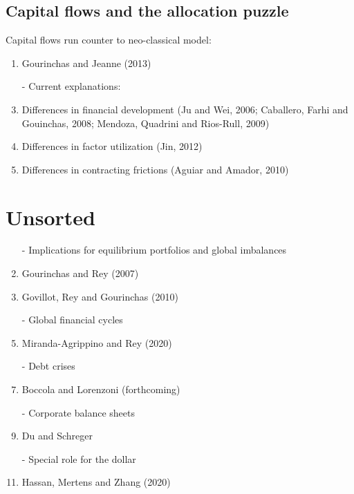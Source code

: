 \documentclass[12pt,letter]{article}
\theoremstyle{break} \theorembodyfont{\normalfont\itshape}
\theoremstyle{break}
\theoremstyle{break} \theorembodyfont{\normalfont\itshape}
\theoremstyle{break} \theorembodyfont{\normalfont\itshape}
\begin{document}
\subsection{Capital flows and the allocation puzzle}
Capital flows run counter to neo-classical model:
\begin{enumerate}
\item Gourinchas and Jeanne (2013)
\item[-] Current explanations:
\item Differences in financial development (Ju and Wei, 2006;
  Caballero, Farhi and Gouinchas, 2008; Mendoza, Quadrini and
  Rios-Rull, 2009)
\item Differences in factor utilization (Jin, 2012)
\item Differences in contracting frictions (Aguiar and Amador, 2010)
\end{enumerate}

\section{Unsorted}
\begin{enumerate}
\item[-] Implications for equilibrium portfolios and global imbalances
\item Gourinchas and Rey (2007)
\item Govillot, Rey and Gourinchas (2010)
\item[-] Global financial cycles
\item Miranda-Agrippino and Rey (2020)
\item[-] Debt crises
\item Boccola and Lorenzoni (forthcoming)
\item[-] Corporate balance sheets
\item Du and Schreger
\item[-] Special role for the dollar
\item Hassan, Mertens and Zhang (2020)
\end{enumerate}
\end{document}
